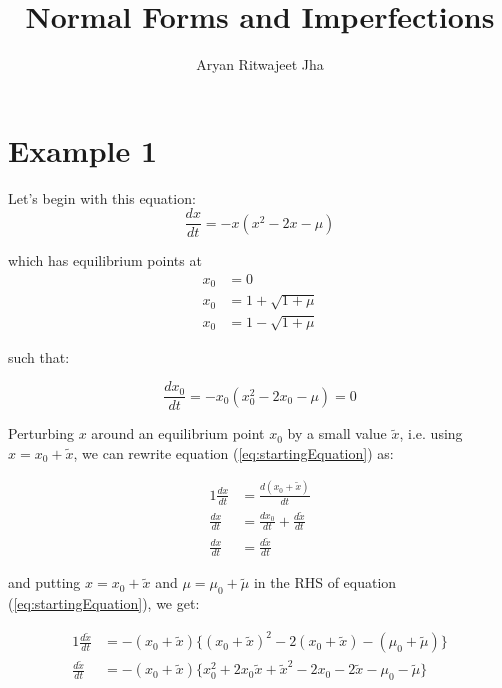 \documentclass{article}
\begin{document}
	\title{Normal Forms and Imperfections}
	\author{Aryan Ritwajeet Jha}
	\maketitle
	
	\section*{Example 1}
	Let's begin with this equation: 
	\begin{equation}
		\label{eq:startingEquation}
		\frac{dx}{dt} = -x(x^2-2x-\mu)
	\end{equation}
	
	which has equilibrium points at	
	\begin{align*}
		x_0 &= 0 \\
		x_0 &= 1 +\sqrt{1+\mu} \\
		x_0 &= 1 -\sqrt{1+\mu}
	\end{align*} 
	
	such that:
	
	\begin{equation}
		\label{eq:startingEquationEqui}
		\frac{dx_0}{dt} = -x_0(x_0^2-2x_0-\mu) = 0 
	\end{equation}
	
	
	Perturbing $x$ around an equilibrium point $x_0$ by a small value $\tilde x$, i.e. using $x = x_0 + \tilde x$, we can rewrite equation (\ref{eq:startingEquation}) as:
	
	\begin{alignat}{1}
		\label{eq:startingEquationPerturbed}
		\frac{dx}{dt} &= \frac{d(x_0 + \tilde x)}{dt} \nonumber \\		
		\frac{dx}{dt} &= \frac{dx_0}{dt} + \frac{d \tilde x}{dt} \\		
		\frac{dx}{dt} &= \frac{d \tilde x}{dt} \nonumber
	\end{alignat}
	
	and putting $x = x_0 + \tilde x$ and $\mu = \mu_0 + \tilde{\mu}$ in the RHS of equation (\ref{eq:startingEquation}), we get:
	
	\begin{alignat}{1}
		\label{eq:startingEquationPerturbed2}
		\frac{d\tilde x}{dt} &= -(x_0+\tilde{x})\{(x_0+\tilde{x})^2-2(x_0+\tilde{x})-(\mu_0+\tilde{\mu})\} \nonumber \\		
		\frac{d\tilde x}{dt} &= -(x_0+\tilde{x})\{x_0^2 + 2x_0\tilde{x} +\tilde{x}^2 -2x_0 -2\tilde{x}-\mu_0 -\tilde{\mu}\}		
	\end{alignat}
\end{document}
